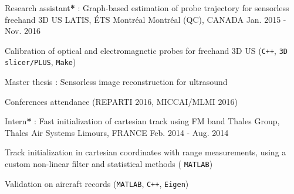 \begin{cventries}

\cventry
{Research assistant\textbf{*} : Graph-based estimation of probe trajectory for sensorless freehand 3D US}%
{LATIS, ÉTS Montréal} %
{\hspace{-5mm}Montréal (QC), CANADA} %
{Jan. 2015 - Nov. 2016} %
{ %
\begin{cvitems}
\item {Calibration of optical and electromagnetic probes for freehand 3D US (\texttt{C++}, \texttt{3D slicer/PLUS}, \texttt{Make})}
\item {Master thesis \cite{tetrel2016estimation}: Sensorless image reconstruction for ultrasound}
\item {Conferences attendance (REPARTI 2016, MICCAI/MLMI 2016)}
\end{cvitems}
}


\cventry
{Intern\textbf{*} : Fast initialization of cartesian track using FM band} %
{Thales Group, Thales Air Systems} %
{Limours, FRANCE} %
{Feb. 2014 - Aug. 2014} %
{ %
\begin{cvitems}
\item {Track initialization in cartesian coordinates with range measurements, using a custom non-linear filter and statistical methods ( \texttt{MATLAB})}
\item {Validation on aircraft records (\texttt{MATLAB}, \texttt{C++}, \texttt{Eigen})}
\end{cvitems}
}
\end{cventries}
